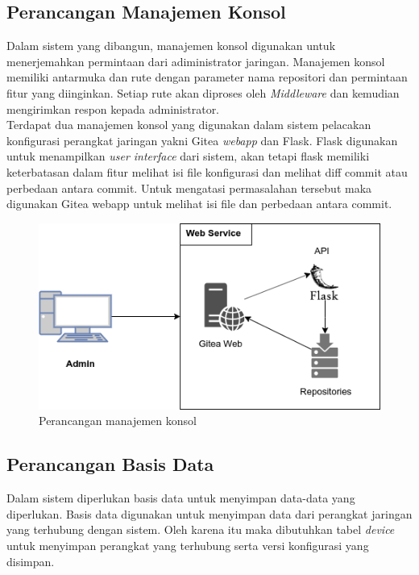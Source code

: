         
        \subsection{Perancangan Manajemen Konsol}
        	Dalam sistem yang dibangun, manajemen konsol digunakan untuk menerjemahkan permintaan dari adiministrator jaringan. Manajemen konsol memiliki antarmuka dan rute dengan parameter nama repositori dan permintaan fitur yang diinginkan. Setiap rute akan diproses oleh \textit{Middleware} dan kemudian mengirimkan respon kepada administrator.\\
        	\indent Terdapat dua manajemen konsol yang digunakan dalam sistem pelacakan konfigurasi perangkat jaringan yakni Gitea \textit{webapp} dan Flask. Flask digunakan untuk menampilkan \textit{user interface} dari sistem, akan tetapi flask memiliki keterbatasan dalam fitur melihat isi file konfigurasi dan melihat diff commit atau perbedaan antara commit. Untuk mengatasi permasalahan tersebut maka digunakan Gitea webapp untuk melihat isi file dan perbedaan antara commit.   
         	\begin{figure}[H]
         		\centering
         		\includegraphics[width=\textwidth]{Images/C-3/Web_Service.png}
         		\caption{Perancangan manajemen konsol}
         		\label{ManajemenKonsol}
         	\end{figure}
         
         \subsection{Perancangan Basis Data}
         Dalam sistem diperlukan basis data untuk menyimpan data-data yang diperlukan. Basis data digunakan untuk menyimpan data dari perangkat jaringan yang terhubung dengan sistem. Oleh karena itu maka dibutuhkan tabel \textit{device} untuk menyimpan perangkat yang terhubung serta versi konfigurasi yang disimpan.
        
       
            
        